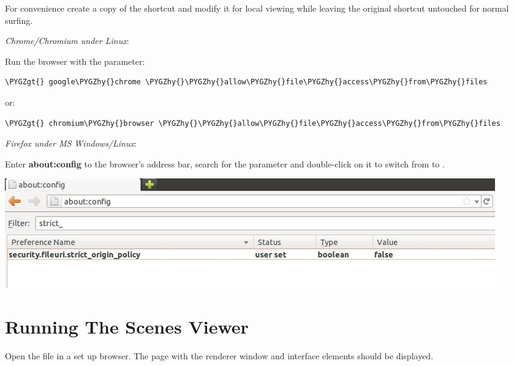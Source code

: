 \documentclass[a4paper,12pt,oneside]{sphinxmanual}
\def\PYGZgt{\char`\>}
\def\PYGZhy{\char`\-}
\begin{document}
\begin{DUlineblock}{0em}
\item[] 
\end{DUlineblock}

For convenience create a copy of the shortcut and modify it for local viewing while leaving the original shortcut untouched for normal surfing.

\emph{Chrome/Chromium under Linux}:

Run the browser with the parameter:

\begin{Verbatim}[commandchars=\\\{\}]
\PYGZgt{} google\PYGZhy{}chrome \PYGZhy{}\PYGZhy{}allow\PYGZhy{}file\PYGZhy{}access\PYGZhy{}from\PYGZhy{}files
\end{Verbatim}

or:

\begin{Verbatim}[commandchars=\\\{\}]
\PYGZgt{} chromium\PYGZhy{}browser \PYGZhy{}\PYGZhy{}allow\PYGZhy{}file\PYGZhy{}access\PYGZhy{}from\PYGZhy{}files
\end{Verbatim}

\emph{Firefox under MS Windows/Linux}:

Enter \textbf{about:config} to the browser's address bar, search for the  parameter and double-click on it to switch from  to .

\begin{DUlineblock}{0em}
\item[] 
\end{DUlineblock}

{\hfill\includegraphics[width=1.000\linewidth]{firefox_strict_origin.jpg}\hfill}

\begin{DUlineblock}{0em}
\item[] 
\end{DUlineblock}


\section{Running The Scenes Viewer}
\label{setup:id6}\label{setup:getting-started-launching-viewer}\label{setup:index-1}
Open the  file in a set up browser. The page with the renderer window and interface elements should be displayed.
\end{document}
